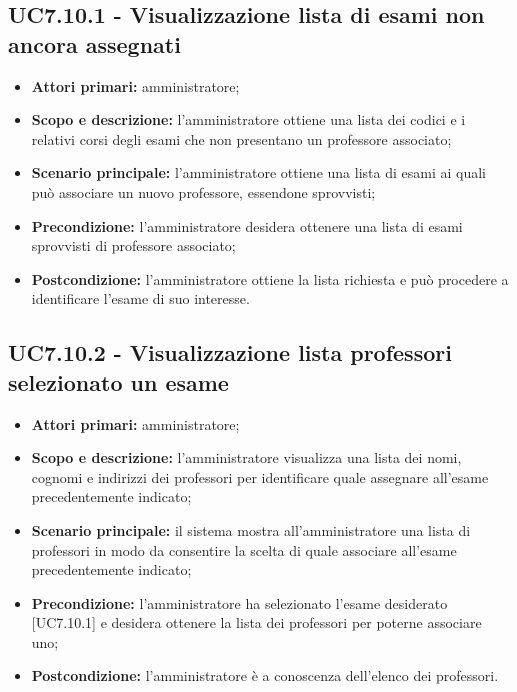 \documentclass[AnalisiDeiRequisiti.tex]{subfiles}
\begin{document}
\subsection{UC7.10.1 - Visualizzazione lista di esami non ancora assegnati}
\begin{itemize}
\item \textbf{Attori primari:} amministratore;
\item \textbf{Scopo e descrizione:} l'amministratore ottiene una lista dei codici e i relativi corsi degli esami che non presentano un professore associato;
\item \textbf{Scenario principale:} l'amministratore ottiene una lista di esami ai quali può associare un nuovo professore, essendone sprovvisti;
\item \textbf{Precondizione:} l'amministratore desidera ottenere una lista di esami sprovvisti di professore associato; 
\item \textbf{Postcondizione:} l'amministratore ottiene la lista richiesta e può procedere a identificare l'esame di suo interesse.
\end{itemize}
\subsection{UC7.10.2 - Visualizzazione lista professori selezionato un esame}
\begin{itemize}
	\item \textbf{Attori primari:} amministratore;
	\item \textbf{Scopo e descrizione:} l'amministratore visualizza una lista dei nomi, cognomi e indirizzi dei professori per identificare quale assegnare all'esame precedentemente indicato;
	\item \textbf{Scenario principale:} il sistema mostra all'amministratore una lista di professori in modo da consentire la scelta di quale associare all'esame precedentemente indicato;
	\item \textbf{Precondizione:} l'amministratore ha selezionato l'esame desiderato [UC7.10.1] e desidera ottenere la lista dei professori per poterne associare uno;  
	\item \textbf{Postcondizione:} l'amministratore è a conoscenza dell'elenco dei professori.
\end{itemize}
\end{document}
